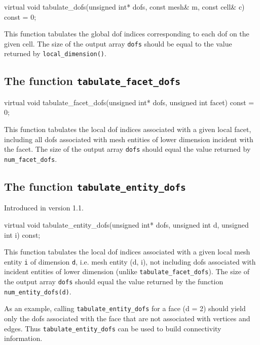 \begin{code}
virtual void tabulate_dofs(unsigned int* dofs,
                           const mesh& m,
                           const cell& c) const = 0;
\end{code}

This function tabulates the global dof indices corresponding to each
dof on the given cell. The size of the output array \texttt{dofs}
should be equal to the value returned by \texttt{local\_dimension()}.

\subsection{The function \texttt{tabulate\_facet\_dofs}}

\begin{code}
virtual void
tabulate_facet_dofs(unsigned int* dofs,
                    unsigned int facet) const = 0;
\end{code}

This function tabulates the local dof indices associated with a given local
facet, including all dofs associated with mesh entities of lower dimension
incident with the facet. The size of the output array \texttt{dofs} should
equal the value returned by \texttt{num\_facet\_dofs}.

\subsection{The function \texttt{tabulate\_entity\_dofs}}
Introduced in version 1.1.

\begin{code}
virtual void tabulate_entity_dofs(unsigned int* dofs,
                                  unsigned int d,
                                  unsigned int i) const;
\end{code}

This function tabulates the local dof indices associated with a given local
mesh entity \texttt{i} of dimension \texttt{d}, i.e. mesh entity (d, i),
not including dofs associated with incident entities of lower dimension
(unlike \texttt{tabulate\_facet\_dofs}).
The size of the output array \texttt{dofs} should equal
the value returned by the function \texttt{num\_entity\_dofs(d)}.

As an example, calling \texttt{tabulate\_entity\_dofs} for a face (d = 2)
should yield only the dofs associated with the face that are not associated
with vertices and edges. Thus \texttt{tabulate\_entity\_dofs} can
be used to build connectivity information.


